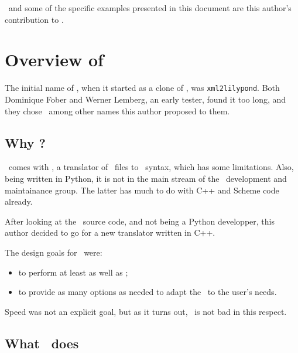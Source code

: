 \documentclass[12pt,a4paper]{article}
\begin{document}
\xmlToLy\ and some of the specific examples presented in this document are this author's contribution to \lib.


\section{Overview of \xmlToLy\ }

The initial name of \xmlToLy, when it started as a clone of \xmlToGuido, was {\tt xml2lilypond}. Both Dominique Fober and Werner Lemberg, an early tester, found it too long, and they chose \xmlToLy\ among other names this author proposed to them.

\subsection{Why \xmlToLy?}

\lily\ comes with \mxmlToLy, a translator of \mxml\ files to \lily\ syntax, which has some limitations. Also, being written in Python, it is not in the main stream of the \lily\ development and maintainance group. The latter has much to do with C++ and Scheme code already.

After looking at the \mxmlToLy\ source code, and not being a Python developper, this author decided to go for a new translator written in C++.

The design goals for \xmlToLy\ were:
\begin{itemize}
\item to perform at least as well as \mxmlToLy;
\item to provide as many options as needed to adapt the \lcg\ to the user's needs.
\end{itemize}

Speed was not an explicit goal, but as it turns out, \xmlToLy\ is not bad in this respect.

\subsection{What \xmlToLy\ does}
\end{document}
